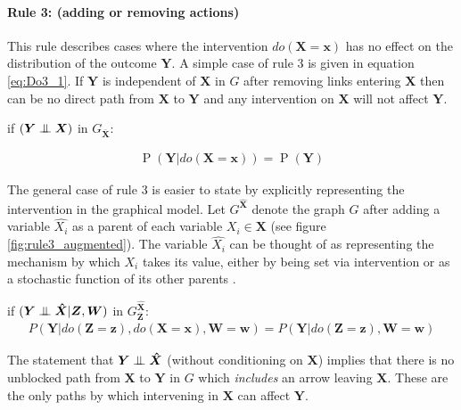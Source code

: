 \documentclass[11pt,a4paper,twoside]{report}
\newcommand{\eqn}[1]{\begin{align}#1\end{align}}
\renewcommand{\P}[1]{\operatorname{P}\left(#1\right)}
\theoremstyle{plain}
\theoremstyle{definition}
\newcommand{\ci}{\mathrel{\perp\mspace{-10mu}\perp}}
\begin{document}
\paragraph{Rule 3: (adding or removing actions)}
This rule describes cases where the intervention $do(\boldsymbol{X}=\boldsymbol{x})$ has no effect on the distribution of the outcome $\boldsymbol{Y}$. A simple case of rule 3 is given in equation \ref{eq:Do3_1}. If $\boldsymbol{Y}$ is independent of $\boldsymbol{{X}}$ in $G$ after removing links entering $\boldsymbol{X}$ then can be no direct path from $\boldsymbol{X}$ to $\boldsymbol{Y}$ and any intervention on $\boldsymbol{X}$ will not affect $\boldsymbol{Y}$.

if $(\boldsymbol{Y} \ci \boldsymbol{{X}})$ in $G_{\boldsymbol{\overline{X}}}$:

\eqn{
\label{eq:Do3_1}
\P{\boldsymbol{Y}|do(\boldsymbol{X}=\boldsymbol{x})} = \P{\boldsymbol{Y}}
}

The general case of rule 3 is easier to state by explicitly representing the intervention in the graphical model. Let $G^{\boldsymbol{\hat{X}}}$ denote the graph $G$ after adding a variable $\hat{X_i}$ as a parent of each variable $X_i \in \boldsymbol{X}$ (see figure \ref{fig:rule3_augmented}). The variable $\hat{X_i}$ can be thought of as representing the mechanism by which $X_i$ takes its value, either by being set via intervention or as a stochastic function of its other parents \citep{Koller2009}.


if $(\boldsymbol{Y} \ci \boldsymbol{\hat{X}} |\boldsymbol{Z},\boldsymbol{W})$ in $G^{\boldsymbol{\hat{X}}}_{\boldsymbol{\overline{Z}}}$:
\eqn{
\label{eq:Do3}
P(\boldsymbol{Y}|do(\boldsymbol{Z}=\boldsymbol{z}),do(\boldsymbol{X}=\boldsymbol{x}),\boldsymbol{W}=\boldsymbol{w}) = P(\boldsymbol{Y}|do(\boldsymbol{Z}=\boldsymbol{z}),\boldsymbol{W}=\boldsymbol{w})
}

The statement that $\boldsymbol{Y} \ci \boldsymbol{\hat{X}}$ (without conditioning on $\boldsymbol{X}$) implies that there is no unblocked path from $\boldsymbol{X}$ to $\boldsymbol{Y}$ in $G$ which \emph{includes} an arrow leaving $\boldsymbol{X}$. These are the only paths by which intervening in $\boldsymbol{X}$ can affect $\boldsymbol{Y}$.
\end{document}
